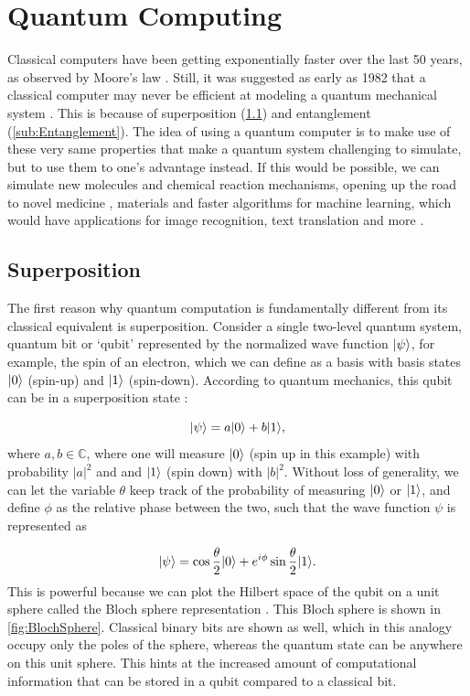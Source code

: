 \section{Quantum Computing}

Classical computers have been getting exponentially faster over the last 50 years, as observed by Moore's law \cite{Moore1965}. 
Still, it was suggested as early as 1982 that a classical computer may never be efficient at modeling a quantum mechanical system \cite{Feynman1982}. 
This is because of superposition (\cref{sub:Superposition}) and entanglement (\cref{sub:Entanglement}). 
The idea of using a quantum computer is to make use of these very same properties that make a quantum system challenging to simulate, but to use them to one's advantage instead. 
If this would be possible, we can simulate new molecules and chemical reaction mechanisms, opening up the road to novel medicine \cite{Robert2021}, materials \cite{Ma2020} and faster algorithms for machine learning, which would have applications for image recognition, text translation and more \cite{Huang2021}.

\subsection{Superposition}\label{sub:Superposition}

The first reason why quantum computation is fundamentally different from its classical equivalent is superposition.
Consider a single two-level quantum system, quantum bit or \lq qubit' represented by the normalized wave function $\lvert\psi\rangle$, for example, the spin of an electron, which we can define as a basis with basis states $\lvert0\rangle$ (spin-up) and $\lvert1\rangle$ (spin-down). 
According to quantum mechanics, this qubit can be in a superposition state \cite{Griffiths2004}:

\begin{equation}\label{eq:SuperPositionBasic}
	\lvert\psi\rangle=a\lvert0\rangle+b\lvert1\rangle,
\end{equation}
where $a,b \in \mathbb{C}$, where one will measure $\lvert0\rangle$ (spin up in this example) with probability $|a|^2$ and and $\lvert1\rangle$ (spin down) with $|b|^2$. 
Without loss of generality, we can let the variable $\theta$ keep track of the probability of measuring $\lvert0\rangle$ or $\lvert1\rangle$, and define $\phi$ as the relative phase between the two, such that the wave function $\psi$ is represented as

\begin{equation}\label{eq:BlochSphere}
	\lvert\psi\rangle = 
	\cos{\frac{\theta}{2}} \lvert0\rangle + e^{i \phi} \sin{\frac{\theta}{2}} \lvert1\rangle.
\end{equation}
This is powerful because we can plot the Hilbert space of the qubit on a unit sphere called the Bloch sphere representation \cite{Nielsen2011}.
This Bloch sphere is shown in \cref{fig:BlochSphere}.
Classical binary bits are shown as well, which in this analogy occupy only the poles of the sphere, whereas the quantum state can be anywhere on this unit sphere. 
This hints at the increased amount of computational information that can be stored in a qubit compared to a classical bit. 

